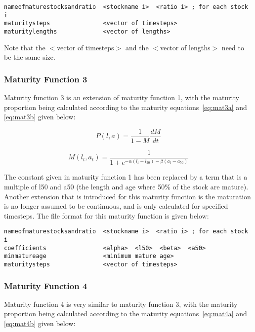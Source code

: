 \documentclass [a4paper, 10pt]{book}
\begin{document}
\begin{verbatim}
nameofmaturestocksandratio  <stockname i>  <ratio i> ; for each stock i
maturitysteps               <vector of timesteps>
maturitylengths             <vector of lengths>
\end{verbatim}

Note that the $<$vector of timesteps$>$ and the $<$vector of lengths$>$ need to be the same size.

\subsubsection{Maturity Function 3}
Maturity function 3 is an extension of maturity function 1, with the maturity proportion being calculated according to the maturity equations~\ref{eq:mat3a} and \ref{eq:mat3b} given below:

\begin{equation}\label{eq:mat3a}
P(l, a) = {\frac{1}{1 - M}}{\frac{dM}{dt}}
\end{equation}

\begin{equation}\label{eq:mat3b}
M(l_{t},a_{t}) = \frac{1}{ 1 + e^{-\alpha(l_{t} - l_{50}) - \beta(a_{t} - a_{50})}}
\end{equation}

\bigskip
The constant given in maturity function 1 has been replaced by a term that is a multiple of l50 and a50 (the length and age where 50\% of the stock are mature).  Another extension that is introduced for this maturity function is the maturation is no longer assumed to be continuous, and is only calculated for specified timesteps.  The file format for this maturity function is given below:

\begin{verbatim}
nameofmaturestocksandratio  <stockname i>  <ratio i> ; for each stock i
coefficients                <alpha>  <l50>  <beta>  <a50>
minmatureage                <minimum mature age>
maturitysteps               <vector of timesteps>
\end{verbatim}

\subsubsection{Maturity Function 4}
Maturity function 4 is very similar to maturity function 3, with the maturity proportion being calculated according to the maturity equations~\ref{eq:mat4a} and \ref{eq:mat4b} given below:
\end{document}
